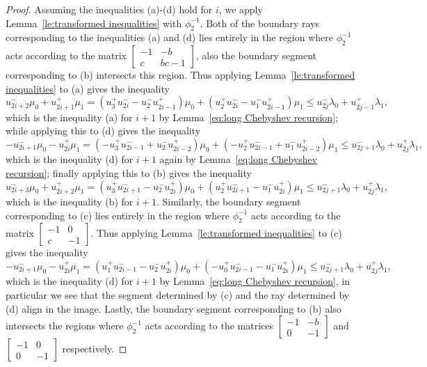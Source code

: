 \documentclass{amsart}
\numberwithin{theorem}{section}
\begin{document}
\begin{proof}
    Assuming the inequalities (a)-(d) hold for $i$, we apply Lemma~\ref{le:transformed inequalities} with $\phi_2^{-1}$.
    Both of the boundary rays corresponding to the inequalities (a) and (d) lies entirely in the region where $\phi_2^{-1}$ acts according to the matrix $\left[ \begin{array}{cc} -1 & -b\\ c & bc-1 \end{array}\right]$, also the boundary segment corresponding to (b) intersects this region.
    Thus applying Lemma~\ref{le:transformed inequalities} to (a) gives the inequality 
    \[u_{2i+2}^-\mu_0+u_{2i+1}^+\mu_1=(u_3^+u_{2i}^--u_2^-u_{2i-1}^+)\mu_0+(u_2^+u_{2i}^--u_1^-u_{2i-1}^+)\mu_1\le u_{2j}^-\lambda_0+u_{2j-1}^+\lambda_1,\]
    which is the inequality (a) for $i+1$ by Lemma~\ref{eq:long Chebyshev recursion}; while applying this to (d) gives the inequality 
    \[-u_{2i+1}^-\mu_0-u_{2i}^+\mu_1=(-u_3^+u_{2i-1}^-+u_2^-u_{2i-2}^+)\mu_0+(-u_2^+u_{2i-1}^-+u_1^-u_{2i-2}^+)\mu_1\le u_{2j+1}^-\lambda_0+u_{2j}^+\lambda_1,\]
    which is the inequality (d) for $i+1$ again by Lemma~\ref{eq:long Chebyshev recursion}; finally applying this to (b) gives the inequality 
    \[u_{2i+3}^-\mu_0+u_{2i+2}^+\mu_1=(u_3^+u_{2i+1}^--u_2^-u_{2i}^+)\mu_0+(u_2^+u_{2i+1}^--u_1^-u_{2i}^+)\mu_1\le u_{2j+1}^-\lambda_0+u_{2j}^+\lambda_1,\]
    which is the inequality (b) for $i+1$.
    Similarly, the boundary segment corresponding to (c) lies entirely in the region where $\phi_2^{-1}$ acts according to the matrix $\left[ \begin{array}{cc} -1 & 0\\ c & -1 \end{array}\right]$.
    Thus applying Lemma~\ref{le:transformed inequalities} to (c) gives the inequality 
    \[-u_{2i+1}^-\mu_0-u_{2i}^+\mu_1=(u_1^+u_{2i-1}^--u_2^-u_{2i}^+)\mu_0+(-u_0^+u_{2i-1}^--u_1^-u_{2i}^+)\mu_1\le u_{2j+1}^-\lambda_0+u_{2j}^+\lambda_1,\]
    which is the inequality (d) for $i+1$ by Lemma~\ref{eq:long Chebyshev recursion}, in particular we see that the segment determined by (c) and the ray determined by (d) align in the image.
    Lastly, the boundary segment corresponding to (b) also intersects the regions where $\phi_2^{-1}$ acts according to the matrices $\left[ \begin{array}{cc} -1 & -b\\ 0 & -1 \end{array}\right]$ and $\left[ \begin{array}{cc} -1 & 0\\ 0 & -1 \end{array}\right]$ respectively.

\end{proof}
\end{document}
